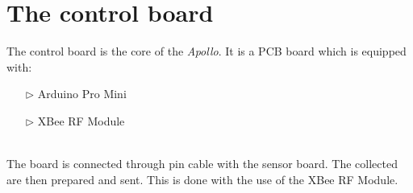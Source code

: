 \documentclass[12pt,a4paper]{report}
\begin{document}
\section{The control board}
The control board is the core of the \emph{Apollo}. It is a PCB board which is equipped with:
\begin{itemize}
\item[$\triangleright$]Arduino Pro Mini
\item[$\triangleright$]XBee RF Module
\end{itemize}
% 
\ \\
The board is connected through pin cable with the sensor board. The collected are then prepared and sent. This is done with the use of the XBee RF Module.\\
%
\end{document}
